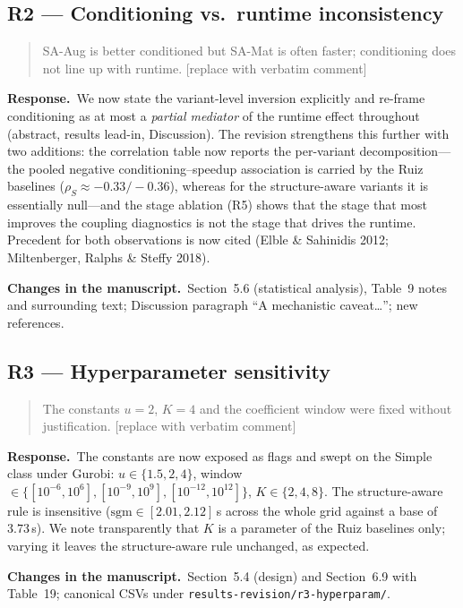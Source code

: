 \documentclass[11pt]{article}
\newenvironment{reviewerquote}%
  {\medskip\noindent\color{quotegray}\itshape\begin{quotation}\noindent}%
  {\end{quotation}\medskip}
\newcommand{\resp}{\noindent\textbf{Response.}\ }
\newcommand{\changes}{\par\smallskip\noindent\textbf{Changes in the manuscript.}\ }
\newcommand{\secref}[1]{Section~#1}
\begin{document}
\subsection*{R2 --- Conditioning vs.\ runtime inconsistency}
\begin{reviewerquote}
SA-Aug is better conditioned but SA-Mat is often faster; conditioning does not line up
with runtime. [replace with verbatim comment]
\end{reviewerquote}
\resp We now state the variant-level inversion explicitly and re-frame conditioning as at
most a \emph{partial mediator} of the runtime effect throughout (abstract, results
lead-in, Discussion). The revision strengthens this further with two additions: the
correlation table now reports the per-variant decomposition---the pooled negative
conditioning--speedup association is carried by the Ruiz baselines
($\rho_S\approx-0.33/-0.36$), whereas for the structure-aware variants it is essentially
null---and the stage ablation (R5) shows that the stage that most improves the coupling
diagnostics is not the stage that drives the runtime. Precedent for both observations is
now cited (Elble \& Sahinidis 2012; Miltenberger, Ralphs \& Steffy 2018).
\changes \secref{5.6} (statistical analysis), Table~9 notes and surrounding text;
Discussion paragraph ``A mechanistic caveat\ldots''; new references.

\subsection*{R3 --- Hyperparameter sensitivity}
\begin{reviewerquote}
The constants $u=2$, $K=4$ and the coefficient window were fixed without justification.
[replace with verbatim comment]
\end{reviewerquote}
\resp The constants are now exposed as flags and swept on the Simple class under Gurobi:
$u\in\{1.5,2,4\}$, window $\in\{[10^{-6},10^{6}],[10^{-9},10^{9}],[10^{-12},10^{12}]\}$,
$K\in\{2,4,8\}$. The structure-aware rule is insensitive ($\mathrm{sgm}\in[2.01,2.12]$\,s
across the whole grid against a base of $3.73$\,s). We note transparently that $K$ is a
parameter of the Ruiz baselines only; varying it leaves the structure-aware rule
unchanged, as expected.
\changes \secref{5.4} (design) and \secref{6.9} with Table~19; canonical CSVs under
\texttt{results-revision/r3-hyperparam/}.
\end{document}
